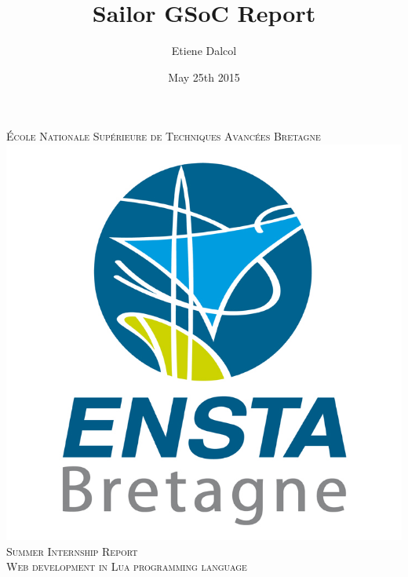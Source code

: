 \documentclass{article}
\title{Sailor GSoC Report}
\date{May 25th 2015}
\author{Etiene Dalcol}
\begin{document}

\begin{titlepage}

\newcommand{\HRule}{\rule{\linewidth}{0.5mm}} %

\center %
 

\textsc{\LARGE École Nationale Supérieure de Techniques Avancées Bretagne}\\[0.5cm] %
\includegraphics[scale=0.15]{enstalogo.jpg}\\[0.5cm]
\textsc{\Large Summer Internship Report}\\[0.5cm] %
\textsc{\large Web development in Lua programming language}\\[0.5cm] %



\end{titlepage}
\end{document}
